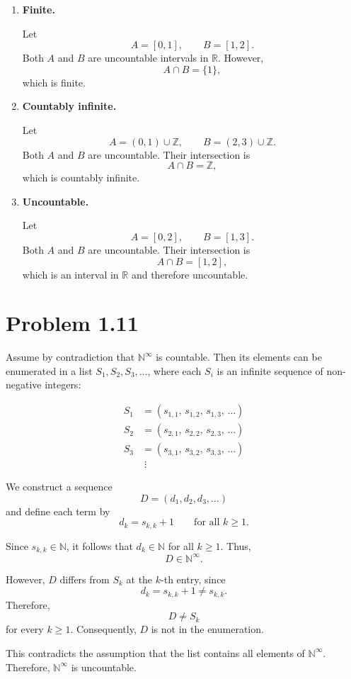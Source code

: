 \documentclass[12pt]{article}
\begin{document}
\begin{enumerate}[label=\alph*)]

    \item \textbf{Finite.}
    
    Let
    \[
    A = [0,1], \qquad B = [1,2].
    \]
    Both $A$ and $B$ are uncountable intervals in $\mathbb{R}$.
    However,
    \[
    A \cap B = \{1\},
    \]
    which is finite.

    \item \textbf{Countably infinite.}
    
    Let
    \[
    A = (0,1) \cup \mathbb{Z}, \qquad
    B = (2,3) \cup \mathbb{Z}.
    \]
    Both $A$ and $B$ are uncountable. Their intersection is
    \[
    A \cap B = \mathbb{Z},
    \]
    which is countably infinite.

    \item \textbf{Uncountable.}
    
    Let
    \[
    A = [0,2], \qquad B = [1,3].
    \]
    Both $A$ and $B$ are uncountable. Their intersection is
    \[
    A \cap B = [1,2],
    \]
    which is an interval in $\mathbb{R}$ and therefore uncountable.

\end{enumerate}


\section*{Problem 1.11}

Assume by contradiction that $\mathbb{N}^{\infty}$ is countable. Then its
elements can be enumerated in a list
$S_1,S_2,S_3,\dots$, where each $S_i$ is an infinite sequence of
non-negative integers:

\begin{align*}
S_1 &= (s_{1,1},\,s_{1,2},\,s_{1,3},\,\dots) \\
S_2 &= (s_{2,1},\,s_{2,2},\,s_{2,3},\,\dots) \\
S_3 &= (s_{3,1},\,s_{3,2},\,s_{3,3},\,\dots) \\
&\;\vdots
\end{align*}

We construct a sequence
\[
D = (d_1,d_2,d_3,\dots)
\]
and define each term by
\[
d_k = s_{k,k} + 1
\qquad \text{for all } k \geq 1.
\]

Since $s_{k,k} \in \mathbb{N}$, it follows that $d_k \in \mathbb{N}$
for all $k \geq 1$. Thus,
\[
D \in \mathbb{N}^{\infty}.
\]

However, $D$ differs from $S_k$ at the $k$-th entry, since
\[
d_k = s_{k,k} + 1 \neq s_{k,k}.
\]
Therefore,
\[
D \neq S_k
\]
for every $k \geq 1$. Consequently, $D$ is not in the enumeration.

This contradicts the assumption that the list contains all elements of
$\mathbb{N}^{\infty}$. Therefore, $\mathbb{N}^{\infty}$ is uncountable.
\end{document}
